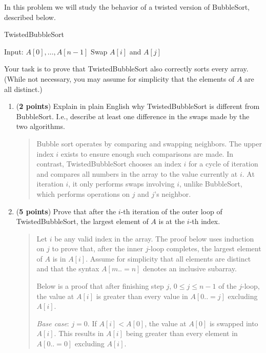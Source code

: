 \documentclass[11pt]{article}
\begin{document}
\begin{enumerate}[leftmargin=*]
In this problem we will study the behavior of a twisted version of BubbleSort, described below.

\begin{algorithm}
\caption{TwistedBubbleSort}
\begin{algorithmic}
\STATE Input: $A[0], \dots, A[n-1]$
            \STATE Swap $A[i]$ and $A[j]$
        \ENDIF
    \ENDFOR
\ENDFOR
\end{algorithmic}
\end{algorithm}

Your task is to prove that TwistedBubbleSort also correctly sorts every array. (While not necessary, you may assume for simplicity that the elements of $A$ are all distinct.)

\begin{enumerate}
    \item (\textbf{2 points}) Explain in plain English why TwistedBubbleSort is different from BubbleSort. I.e., describe at least one difference in the swaps made by the two algorithms.
      \begin{quote}
        \color{purple}
        Bubble sort operates by comparing and swapping neighbors. The upper index $i$ exists to ensure enough such comparisons are made. In contrast, TwistedBubbleSort chooses an index $i$ for a cycle of iteration and compares all numbers in the array to the value currently at $i$. At iteration $i$, it only performs swaps involving $i$, unlike BubbleSort, which performs operations on $j$ and $j$'s neighbor.
      \end{quote}
    \item (\textbf{5 points}) Prove that after the $i$-th iteration of the outer loop of TwistedBubbleSort, the largest element of $A$ is at the $i$-th index.
      \begin{quote}
        \color{purple}
        Let $i$ be any valid index in the array. The proof below uses induction on $j$ to prove that, after the inner $j$-loop completes, the largest element of $A$ is in $A[i]$. Assume for simplicity that all elements are distinct and that the syntax $A[m..=n]$ denotes an inclusive subarray. 

        \medskip
        Below is a proof that after finishing step $j$, $0 \leq j \leq n - 1$ of the $j$-loop, the value at $A[i]$ is greater than every value in $A[0..=j]$ excluding $A[i]$.

        \medskip
        \textit{Base case}: $j = 0$. If $A[i] < A[0]$, the value at $A[0]$ is swapped into $A[i]$. This results in $A[i]$ being greater than every element in $A[0..=0]$ excluding $A[i]$. 


\end{quote}
\end{enumerate}
\end{enumerate}
\end{document}
